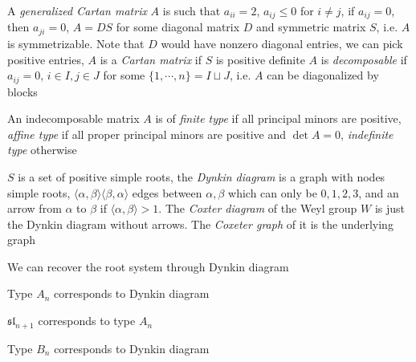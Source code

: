 \documentclass[main]{subfiles}
\begin{document}
\begin{definition}
A \textit{generalized Cartan matrix} $A$ is such that $a_{ii}=2$, $a_{ij}\leq0$ for $i\neq j$, if $a_{ij}=0$, then $a_{ji}=0$, $A=DS$ for some diagonal matrix $D$ and symmetric matrix $S$, i.e. $A$ is symmetrizable. Note that $D$ would have nonzero diagonal entries, we can pick positive entries, $A$ is a \textit{Cartan matrix} if $S$ is positive definite
$A$ is \textit{decomposable} if $a_{ij}=0$, $i\in I,j\in J$ for some $\{1,\cdots,n\}=I\sqcup J$, i.e. $A$ can be diagonalized by blocks \par
An indecomposable matrix $A$ is of \textit{finite type} if all principal minors are positive, \textit{affine type} if all proper principal minors are positive and $\det A=0$, \textit{indefinite type} otherwise
\end{definition}

\begin{definition}
$S$ is a set of positive simple roots, the \textit{Dynkin diagram} is a graph with nodes simple roots, $\langle\alpha,\beta\rangle\langle\beta,\alpha\rangle$ edges between $\alpha,\beta$ which can only be $0,1,2,3$, and an arrow from $\alpha$ to $\beta$ if $\langle\alpha,\beta\rangle>1$. The \textit{Coxter diagram} of the Weyl group $W$ is just the Dynkin diagram without arrows. The \textit{Coxeter graph} of it is the underlying graph
\end{definition}

\begin{theorem}
We can recover the root system through Dynkin diagram
\end{theorem}

\begin{definition}
Type $A_n$ corresponds to Dynkin diagram
\begin{center}
\end{center}
\end{definition}

\begin{example}
$\mathfrak{sl}_{n+1}$ corresponds to type $A_n$
\end{example}

\begin{definition}
Type $B_n$ corresponds to Dynkin diagram
\begin{center}
\end{center}
\end{definition}
\end{document}
